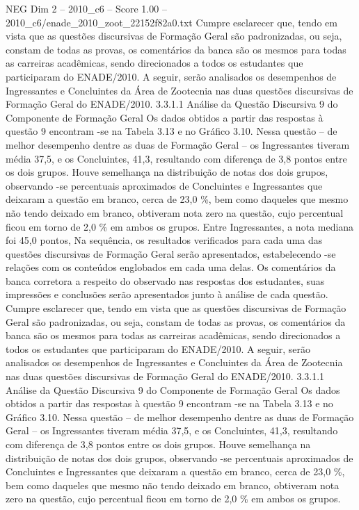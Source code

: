 \begin{textsample}{NEG Dim 2 – 2010\_c6 – Score 1.00 – 2010\_c6/enade\_2010\_zoot\_22152f82a0.txt}
Cumpre esclarecer que, tendo em vista que as questões discursivas de Formação Geral são padronizadas, ou seja, constam de todas as provas, os comentários da banca são os mesmos para todas as carreiras acadêmicas, sendo direcionados a todos os estudantes que participaram do ENADE/2010.
A seguir, serão analisados os desempenhos de Ingressantes e Concluintes da Área de Zootecnia nas duas questões discursivas de Formação Geral do ENADE/2010. 3.3.1.1 Análise da Questão Discursiva 9 do Componente de Formação Geral Os dados obtidos a partir das respostas à questão 9 encontram -se na Tabela 3.13 e no Gráfico 3.10.
Nessa questão – de melhor desempenho dentre as duas de Formação Geral – os Ingressantes tiveram média 37,5, e os Concluintes, 41,3, resultando com diferença de 3,8 pontos entre os dois grupos.
Houve semelhança na distribuição de notas dos dois grupos, observando -se percentuais aproximados de Concluintes e Ingressantes que deixaram a questão em branco, cerca de 23,0 \%, bem como daqueles que mesmo não tendo deixado em branco, obtiveram nota zero na questão, cujo percentual ficou em torno de 2,0 \% em ambos os grupos.
Entre Ingressantes, a nota mediana foi 45,0 pontos, Na sequência, os resultados verificados para cada uma das questões discursivas de Formação Geral serão apresentados, estabelecendo -se relações com os conteúdos englobados em cada uma delas.
Os comentários da banca corretora a respeito do observado nas respostas dos estudantes, suas impressões e conclusões serão apresentados junto à análise de cada questão.
Cumpre esclarecer que, tendo em vista que as questões discursivas de Formação Geral são padronizadas, ou seja, constam de todas as provas, os comentários da banca são os mesmos para todas as carreiras acadêmicas, sendo direcionados a todos os estudantes que participaram do ENADE/2010.
A seguir, serão analisados os desempenhos de Ingressantes e Concluintes da Área de Zootecnia nas duas questões discursivas de Formação Geral do ENADE/2010. 3.3.1.1 Análise da Questão Discursiva 9 do Componente de Formação Geral Os dados obtidos a partir das respostas à questão 9 encontram -se na Tabela 3.13 e no Gráfico 3.10.
Nessa questão – de melhor desempenho dentre as duas de Formação Geral – os Ingressantes tiveram média 37,5, e os Concluintes, 41,3, resultando com diferença de 3,8 pontos entre os dois grupos.
Houve semelhança na distribuição de notas dos dois grupos, observando -se percentuais aproximados de Concluintes e Ingressantes que deixaram a questão em branco, cerca de 23,0 \%, bem como daqueles que mesmo não tendo deixado em branco, obtiveram nota zero na questão, cujo percentual ficou em torno de 2,0 \% em ambos os grupos.

\end{textsample}
